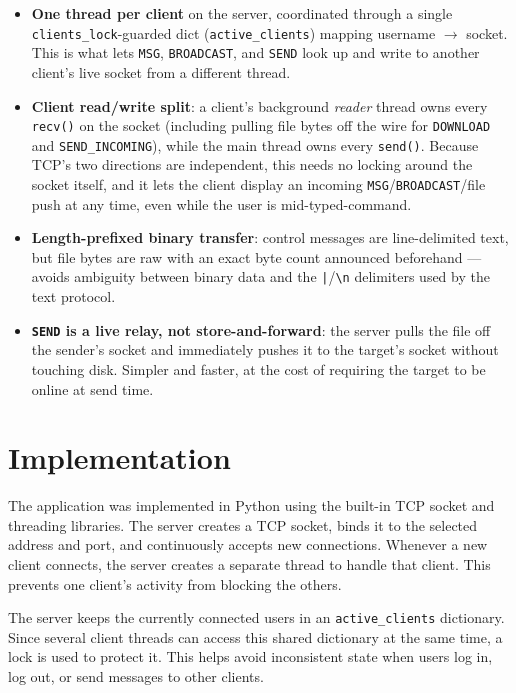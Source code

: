 \documentclass[11pt]{article}
\newcommand{\cmd}[1]{\texttt{#1}}
\begin{document}
\begin{itemize}[leftmargin=1.5em]
  \item \textbf{One thread per client} on the server, coordinated
        through a single \cmd{clients\_lock}-guarded dict
        (\cmd{active\_clients}) mapping username $\to$ socket. This is
        what lets \cmd{MSG}, \cmd{BROADCAST}, and \cmd{SEND} look up and
        write to another client's live socket from a different thread.
  \item \textbf{Client read/write split}: a client's background
        \textit{reader} thread owns every \cmd{recv()} on the socket
        (including pulling file bytes off the wire for \cmd{DOWNLOAD}
        and \cmd{SEND\_INCOMING}), while the main thread owns every
        \cmd{send()}. Because TCP's two directions are independent,
        this needs no locking around the socket itself, and it lets the
        client display an incoming \cmd{MSG}/\cmd{BROADCAST}/file push
        at any time, even while the user is mid-typed-command.
  \item \textbf{Length-prefixed binary transfer}: control messages are
        line-delimited text, but file bytes are raw with an exact byte
        count announced beforehand --- avoids ambiguity between binary
        data and the \cmd{|}/\cmd{\textbackslash{}n} delimiters used by
        the text protocol.
  \item \textbf{\cmd{SEND} is a live relay, not store-and-forward}: the
        server pulls the file off the sender's socket and immediately
        pushes it to the target's socket without touching disk.
        Simpler and faster, at the cost of requiring the target to be
        online at send time.
\end{itemize}

\section{Implementation}

The application was implemented in Python using the built-in TCP socket
and threading libraries. The server creates a TCP socket, binds it to
the selected address and port, and continuously accepts new
connections. Whenever a new client connects, the server creates a
separate thread to handle that client. This prevents one client's
activity from blocking the others.

The server keeps the currently connected users in an
\cmd{active\_clients} dictionary. Since several client threads can
access this shared dictionary at the same time, a lock is used to
protect it. This helps avoid inconsistent state when users log in, log
out, or send messages to other clients.
\end{document}

